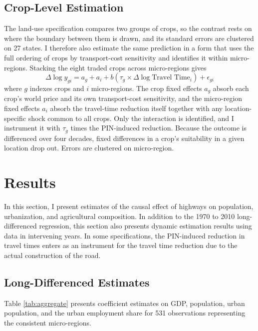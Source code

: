 \documentclass[11pt]{article}
\begin{document}
\subsection{Crop-Level Estimation}
\label{sec:croplevel}

The land-use specification compares two groups of crops, so the contrast rests on where the boundary between them is drawn, and its standard errors are clustered on 27 states. I therefore also estimate the same prediction in a form that uses the full ordering of crops by transport-cost sensitivity and identifies it within micro-regions. Stacking the eight traded crops across micro-regions gives
\begin{equation}
    \Delta \log y_{gi} = a_g + a_i + b \left(\tau_g \times \Delta \log \text{Travel Time}_i\right) + \epsilon_{gi}
    \label{eq:pooled}
\end{equation}
where $g$ indexes crops and $i$ micro-regions. The crop fixed effects $a_g$ absorb each crop's world price and its own transport-cost sensitivity, and the micro-region fixed effects $a_i$ absorb the travel-time reduction itself together with any location-specific shock common to all crops. Only the interaction is identified, and I instrument it with $\tau_g$ times the PIN-induced reduction. Because the outcome is differenced over four decades, fixed differences in a crop's suitability in a given location drop out. Errors are clustered on micro-region.

\section{Results}
In this section, I present estimates of the causal effect of highways on population, urbanization, and agricultural composition. In addition to the 1970 to 2010 long-differenced regression, this section also presents dynamic estimation results using data in intervening years. In some specifications, the PIN-induced reduction in travel times enters as an instrument for the travel time reduction due to the actual construction of the road.

\subsection{Long-Differenced Estimates}

Table \ref{tab:aggregate} presents coefficient estimates on GDP, population, urban population, and the urban employment share for 531 observations representing the consistent micro-regions.
\end{document}
